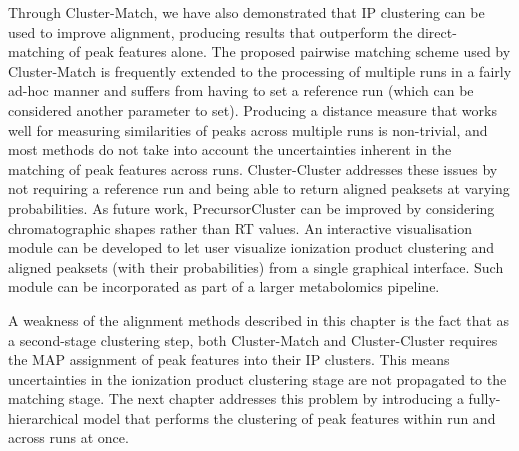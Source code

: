Through Cluster-Match, we have also demonstrated that IP clustering can be used to improve alignment, producing results that outperform the direct-matching of peak features alone. The proposed pairwise matching scheme used by Cluster-Match is frequently extended to the processing of multiple runs in a fairly ad-hoc manner and suffers from having to set a reference run (which can be considered another parameter to set). Producing a distance measure that works well for measuring similarities of peaks across multiple runs is non-trivial, and most methods do not take into account the uncertainties inherent in the matching of peak features across runs. Cluster-Cluster addresses these issues by not requiring a reference run and being able to return aligned peaksets at varying probabilities. As future work, PrecursorCluster can be improved by considering chromatographic shapes rather than RT values. An interactive visualisation module can be developed to let user visualize ionization product clustering and aligned peaksets (with their probabilities) from a single graphical interface. Such module can be incorporated as part of a larger metabolomics pipeline.

A weakness of the alignment methods described in this chapter is the fact that as a second-stage clustering step, both Cluster-Match and Cluster-Cluster requires the MAP assignment of peak features into their IP clusters. This means uncertainties in the ionization product clustering stage are not propagated to the matching stage. The next chapter addresses this problem by introducing a fully-hierarchical model that performs the clustering of peak features within run and across runs at once.